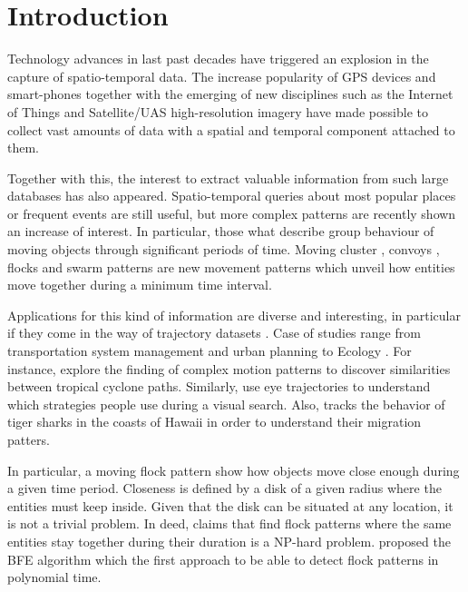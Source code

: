 \section{Introduction}
Technology advances in last past decades have triggered an explosion in the capture of spatio-temporal data.  The increase popularity of GPS devices and smart-phones together with the emerging of new disciplines such as the Internet of Things and Satellite/UAS high-resolution imagery have made possible to collect vast amounts of data with a spatial and temporal component attached to them.

Together with this, the interest to extract valuable information from such large databases has also appeared.  Spatio-temporal queries about most popular places or frequent events are still useful, but more complex patterns are recently shown an increase of interest.  In particular, those what describe group behaviour of moving objects through significant periods of time.  Moving cluster \cite{kalnis_discovering_2005}, convoys \cite{jeung_discovery_2008}, flocks \cite{gudmundsson_computing_2006} and swarm patterns \cite{li_swarm:_2010} are new movement patterns which unveil how entities move together during a minimum time interval. 

Applications for this kind of information are diverse and interesting, in particular if they come in the way of trajectory datasets \cite{jeung_trajectory_2011, huang_mining_2015}. Case of studies range from transportation system management and urban planning \cite{di_lorenzo_allaboard:_2016} to Ecology \cite{la_sorte_convergence_2016}.  For instance, \cite{turdukulov_visual_2014} explore the finding of complex motion patterns to discover similarities between tropical cyclone paths.  Similarly, \cite{amor_persistence_2016} use eye trajectories to understand which strategies people use during a visual search. Also, \cite{holland_movements_1999} tracks the behavior of tiger sharks in the coasts of Hawaii in order to understand their migration patters.

In particular, a moving flock pattern show how objects move close enough during a given time period.  Closeness is defined by a disk of a given radius where the entities must keep inside.  Given that the disk can be situated at any location, it is not a trivial problem.  In deed, \cite{gudmundsson_computing_2006} claims that find flock patterns where the same entities stay together during their duration is a NP-hard problem. \cite{vieira_2009} proposed the BFE algorithm which the first approach to be able to detect flock patterns in polynomial time.

